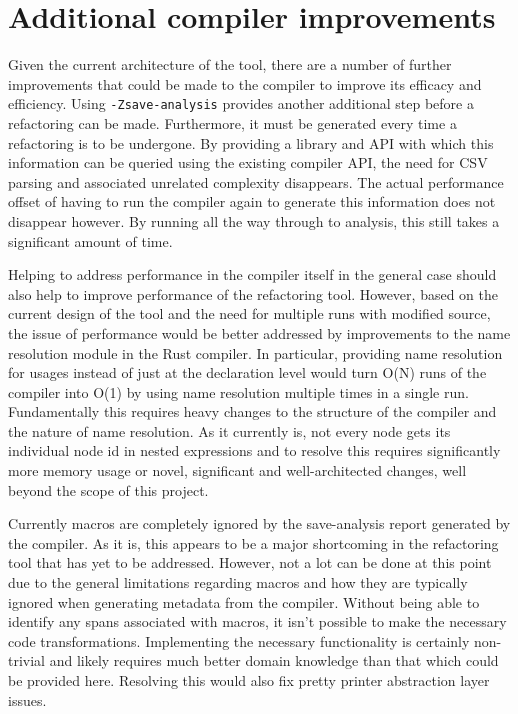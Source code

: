 \section{Additional compiler improvements}
Given the current architecture of the tool, there are a number of further improvements that could be made to the compiler to improve its efficacy and efficiency. Using {\verb|-Zsave-analysis|} provides another additional step before a refactoring can be made. Furthermore, it must be generated every time a refactoring is to be undergone. By providing a library and API with which this information can be queried using the existing compiler API, the need for CSV parsing and associated unrelated complexity disappears. The actual performance offset of having to run the compiler again to generate this information does not disappear however.  By running all the way through to analysis, this still takes a significant amount of time. 


Helping to address performance in the compiler itself in the general case should also help to improve performance of the refactoring tool. However, based on the current design of the tool and the need for multiple runs with modified source, the issue of performance would be better addressed by improvements to the name resolution module in the Rust compiler. In particular, providing name resolution for usages instead of just at the declaration level would turn O(N) runs of the compiler into O(1) by using name resolution multiple times in a single run. Fundamentally this requires heavy changes to the structure of the compiler and the nature of name resolution. As it currently is, not every node gets its individual node id in nested expressions and to resolve this requires significantly more memory usage or novel, significant and well-architected changes, well beyond the scope of this project.


Currently macros are completely ignored by the save-analysis report generated by the compiler. As it is, this appears to be a major shortcoming in the refactoring tool that has yet to be addressed. However, not a lot can be done at this point due to the general limitations regarding macros and how they are typically ignored when generating metadata from the compiler. Without being able to identify any spans associated with macros, it isn't possible to make the necessary code transformations. Implementing the necessary functionality is certainly non-trivial and likely requires much better domain knowledge than that which could be provided here. Resolving this would also fix pretty printer abstraction layer issues.

